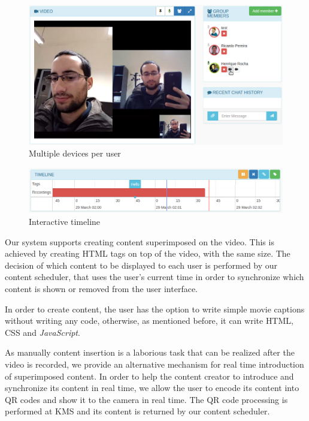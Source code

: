 \documentclass[10pt,conference]{IEEEtran}
\begin{document}
	\begin{figure}
		\centering
		\includegraphics[width=\linewidth]{figures/devices.png}
		\caption{Multiple devices per user}
		\label{fig:devices}
	\end{figure}

	\begin{figure}
		\centering
		\includegraphics[width=\linewidth]{figures/timeline.png}
		\caption{Interactive timeline}
		\label{fig:timeline}
	\end{figure}




Our system supports creating content superimposed on the video.
This is achieved by creating \gls{HTML} tags on top of the video, with the same size.
The decision of which content to be displayed to each user is performed by our content scheduler, that uses the user's current time in order to synchronize which content is shown or removed from the user interface.

In order to create content, the user has the option to write simple movie captions without writing any code, otherwise, as mentioned before, it can write \gls{HTML}, \gls{CSS} and \emph{JavaScript}.

As manually content insertion is a laborious task that can be realized after the video is recorded, we provide an alternative mechanism for real time introduction of superimposed content.
In order to help the content creator to introduce and synchronize its content in real time, we allow the user to encode its content into \gls{QR} codes and show it to the camera in real time.
The \gls{QR} code processing is performed at \gls{KMS} and its content is returned by our content scheduler.
\end{document}
